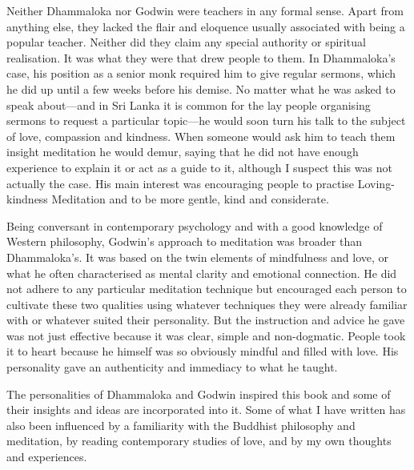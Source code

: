 \documentclass[10pt, openright]{book}
\begin{document}
Neither Dhammaloka nor Godwin were teachers in any formal sense. Apart from anything else, they lacked the flair and eloquence usually associated with being a popular teacher. Neither did they claim any special authority or spiritual realisation. It was what they were that drew people to them. In Dhammaloka’s case, his position as a senior monk required him to give regular sermons, which he did up until a few weeks before his demise. No matter what he was asked to speak about—and in Sri Lanka it is common for the lay people organising sermons to request a particular topic—he would soon turn his talk to the subject of love, compassion and kindness. When someone would ask him to teach them insight meditation he would demur, saying that he did not have enough experience to explain it or act as a guide to it, although I suspect this was not actually the case. His main interest was encouraging people to practise Loving-kindness Meditation and to be more gentle, kind and considerate.


Being conversant in contemporary psychology and with a good knowledge of Western philosophy, Godwin’s approach to meditation was broader than Dhammaloka’s. It was based on the twin elements of mindfulness and love, or what he often characterised as mental clarity and emotional connection. He did not adhere to any particular meditation technique but encouraged each person to cultivate these two qualities using whatever techniques they were already familiar with or whatever suited their personality. But the instruction and advice he gave was not just effective because it was clear, simple and non-dogmatic. People took it to heart because he himself was so obviously mindful and filled with love. His personality gave an authenticity and immediacy to what he taught.


The personalities of Dhammaloka and Godwin inspired this book and some of their insights and ideas are incorporated into it. Some of what I have written has also been influenced by a familiarity with the Buddhist philosophy and meditation, by reading contemporary studies of love, and by my own thoughts and experiences.
\end{document}
